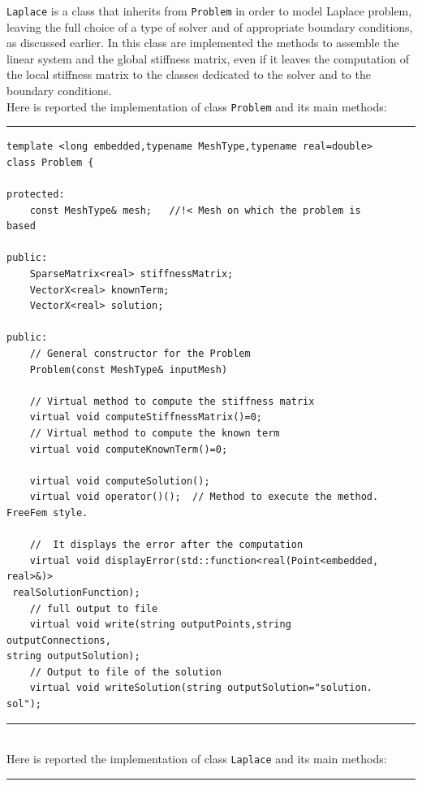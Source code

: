 \verb|Laplace| is a class that inherits from \verb|Problem| in order to model Laplace problem, leaving the full choice of a type of solver and of appropriate boundary conditions, as discussed earlier. In this class are implemented the methods to assemble the linear system and the global stiffness matrix, even if it leaves the computation of the local stiffness matrix to the classes dedicated to the solver and to the boundary conditions. \\

Here is reported the implementation of class \verb|Problem| and its main methods:

\noindent\rule{12.7cm}{1pt}
\begin{verbatim}
template <long embedded,typename MeshType,typename real=double>
class Problem {
	
protected:
    const MeshType& mesh;	//!< Mesh on which the problem is
based

public:
    SparseMatrix<real> stiffnessMatrix;
    VectorX<real> knownTerm;
    VectorX<real> solution;
	
public:
    // General constructor for the Problem
    Problem(const MeshType& inputMesh)

    // Virtual method to compute the stiffness matrix
    virtual void computeStiffnessMatrix()=0;
    // Virtual method to compute the known term
    virtual void computeKnownTerm()=0;	

    virtual void computeSolution();
    virtual void operator()();  // Method to execute the method.
FreeFem style.

    //  It displays the error after the computation
    virtual void displayError(std::function<real(Point<embedded,
real>&)>
 realSolutionFunction);
    // full output to file 
    virtual void write(string outputPoints,string 
outputConnections,
string outputSolution);	
    // Output to file of the solution
    virtual void writeSolution(string outputSolution="solution.
sol");
\end{verbatim}
\noindent\rule{12.7cm}{1pt}\\

Here is reported the implementation of class \verb|Laplace| and its main methods:

\noindent\rule{12.7cm}{1pt}

